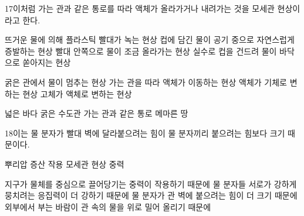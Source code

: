 \documentclass[fs85,seriesRus]{korfarm-base}
\begin{document}
\begin{kfSentenceUnit}{17}{이처럼 가는 관과 같은 통로를 따라 액체가 올라가거나 내려가는 것을 모세관 현상이라고 한다.}
\begin{kfChoices}
\kfChoice 뜨거운 물에 의해 플라스틱 빨대가 녹는 현상
\kfChoice 컵에 담긴 물이 공기 중으로 자연스럽게 증발하는 현상
\kfChoice 빨대 안쪽으로 물이 조금 올라가는 현상
\kfChoice 실수로 컵을 건드려 물이 바닥으로 쏟아지는 현상
\end{kfChoices}
\begin{kfChoices}
\kfChoice 굵은 관에서 물이 멈추는 현상
\kfChoice 가는 관을 따라 액체가 이동하는 현상
\kfChoice 액체가 기체로 변하는 현상
\kfChoice 고체가 액체로 변하는 현상
\end{kfChoices}
\begin{kfChoices}
\kfChoice 넓은 바다
\kfChoice 굵은 수도관
\kfChoice 가는 관과 같은 통로
\kfChoice 메마른 땅
\end{kfChoices}
\end{kfSentenceUnit}

\begin{kfSentenceUnit}{18}{이는 물 분자가 빨대 벽에 달라붙으려는 힘이 물 분자끼리 붙으려는 힘보다 크기 때문이다.}
\begin{kfChoices}
\kfChoice 뿌리압
\kfChoice 증산 작용
\kfChoice 모세관 현상
\kfChoice 중력
\end{kfChoices}
\begin{kfChoices}
\kfChoice 지구가 물체를 중심으로 끌어당기는 중력이 작용하기 때문에
\kfChoice 물 분자들 서로가 강하게 뭉치려는 응집력이 더 강하기 때문에
\kfChoice 물 분자가 관 벽에 붙으려는 힘이 더 크기 때문에
\kfChoice 외부에서 부는 바람이 관 속의 물을 위로 밀어 올리기 때문에
\end{kfChoices}
\end{kfSentenceUnit}
\end{document}
